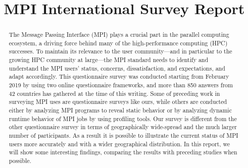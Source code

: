 \documentclass[conference,10pt,letterpaper]{IEEEtran}
\begin{document}
\title{MPI International Survey Report}

\author{
  \and
  \and
  \and
  \and
  \and
  \and
}  

\maketitle

\begin{abstract}
  The Message Passing Interface (MPI) plays a crucial part in the
  parallel computing ecosystem, a driving force behind many of the
  high-performance computing (HPC) successes. To maintain its relevance
  to the user community---and in particular to the growing HPC community
  at large---the MPI standard needs to identify and understand the MPI
  users' status, concerns, dissatisfaction, and expectations, and adapt
  accordingly. This questionnaire survey was conducted starting from February
  2019 by using two online questionnaire frameworks, and more than 850
  answers from 42 countries has gathered at the time of this writing. 
  Some of preceding work in surveying MPI uses are questionnaire surveys
  like ours, while others are conducted either by analyzing MPI programs
  to reveal static behavior or by analyzing dynamic runtime behavior of
  MPI jobs by using profiling tools. Our survey is different from the
  other questionnaire survey in terms of geographically wide-spread and
  the much larger number of participants. As a result it is possible to
  illustrate the current status of MPI users more accurately and with a
  wider geographical distribution. In this report, we will show some
  interesting findings, comparing the results with preceding studies
  when possible.
\end{abstract}
\end{document}
